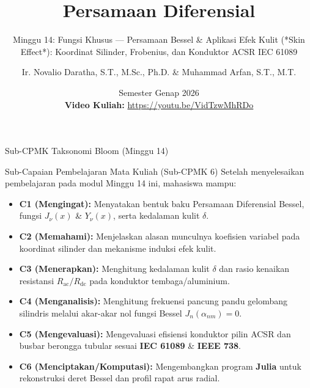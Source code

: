 \documentclass[aspectratio=169,10pt]{beamer}
\title[Persamaan Diferensial (Minggu 14)]{Persamaan Diferensial}
\subtitle{Minggu 14: Fungsi Khusus — Persamaan Bessel \& Aplikasi Efek Kulit (*Skin Effect*): Koordinat Silinder, Frobenius, dan Konduktor ACSR IEC 61089}
\author[Novalio \& Arfan (UNIB)]{Ir. Novalio Daratha, S.T., M.Sc., Ph.D. \& Muhammad Arfan, S.T., M.T.}
\institute[Teknik Elektro UNIB]{Program Studi S1 Teknik Elektro, Jurusan Teknik Elektro \& Informatika\\Fakultas Teknik, Universitas Bengkulu}
\date[2026]{Semester Genap 2026 \\[1.5mm] {\scriptsize\color{red!85!black}\textbf{Video Kuliah:}} {\scriptsize\url{https://youtu.be/VidTzwMhRDo}} \quad \textbar \quad {\scriptsize\href{https://www.youtube.com/playlist?list=PLS5oOZWXZeTw}{\color{unibblue}\textbf{Playlist YouTube}}}}
\begin{document}
\begin{frame}[plain]
  \titlepage
\end{frame}

\begin{frame}{Sub-CPMK Taksonomi Bloom (Minggu 14)}
  \begin{block}{Sub-Capaian Pembelajaran Mata Kuliah (Sub-CPMK 6)}
    Setelah menyelesaikan pembelajaran pada modul Minggu 14 ini, mahasiswa mampu:
    \begin{itemize}
      \item \textbf{C1 (Mengingat):} Menyatakan bentuk baku Persamaan Diferensial Bessel, fungsi $J_\nu(x)$ \& $Y_\nu(x)$, serta kedalaman kulit $\delta$.
      \item \textbf{C2 (Memahami):} Menjelaskan alasan munculnya koefisien variabel pada koordinat silinder dan mekanisme induksi efek kulit.
      \item \textbf{C3 (Menerapkan):} Menghitung kedalaman kulit $\delta$ dan rasio kenaikan resistansi $R_{\text{ac}}/R_{\text{dc}}$ pada konduktor tembaga/aluminium.
      \item \textbf{C4 (Menganalisis):} Menghitung frekuensi pancung pandu gelombang silindris melalui akar-akar nol fungsi Bessel $J_n(\alpha_{nm}) = 0$.
      \item \textbf{C5 (Mengevaluasi):} Mengevaluasi efisiensi konduktor pilin ACSR dan busbar berongga tubular sesuai \textbf{IEC 61089} \& \textbf{IEEE 738}.
      \item \textbf{C6 (Menciptakan/Komputasi):} Mengembangkan program \textbf{Julia} untuk rekonstruksi deret Bessel dan profil rapat arus radial.
    \end{itemize}
  \end{block}
\end{frame}
\end{document}

